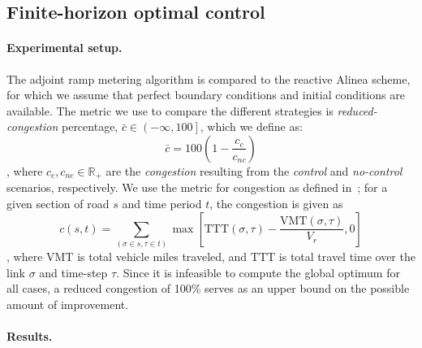 														
														
							\subsection{Finite-horizon optimal control\label{sub:Finite-horizon-optimal-control}}
														
														
							\paragraph{Experimental setup.}
														
							The adjoint ramp metering algorithm is compared to the reactive Alinea
							scheme, for which we assume that perfect boundary conditions and initial conditions
							are available. The metric we use to compare the different strategies is \emph{reduced-congestion} percentage, $\bar{c} \in \left(-\infty,100\right]$, which we define as:
							\[
							\bar{c} = 100 \left(1 - \frac{c_c}{c_{nc}}\right)
							\], where $c_c, c_{nc} \in \mathbb{R}_+$ are the \emph{congestion} resulting from the \emph{control} and \emph{no-control} scenarios, respectively. We use the metric for congestion as defined in~\cite{Skabardonis2003}; for a given section of road $s$ and time period $t$, the congestion is given as
							\[
							c\left(s,t\right) = \sum_{\left(\sigma\in s, \tau\in t\right)} \max \left[\text{TTT}\left(\sigma,\tau\right) - \frac{\text{VMT}\left(\sigma, \tau\right)}{V_r}, 0\right]
							\], where $\text{VMT}$ is total vehicle miles traveled, and $\text{TTT}$ is total travel time over the link $\sigma$ and time-step $\tau$. Since it is infeasible to compute the global optimum for all cases, a reduced congestion of 100\% serves as an upper bound on the possible amount of improvement.

							\paragraph{Results.}
														
